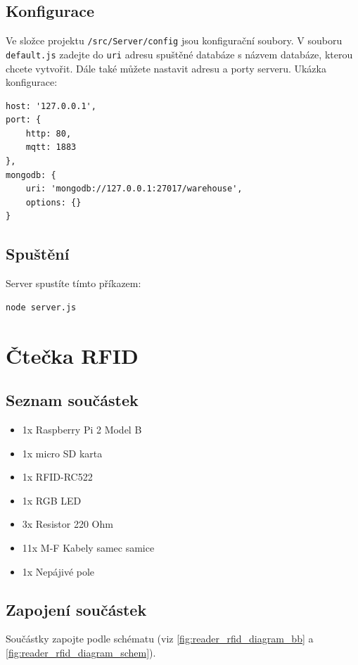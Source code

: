 \documentclass[czech,BP]{thesiskiv}
\begin{document}
\subsection{Konfigurace}
Ve složce projektu \texttt{/src/Server/config} jsou konfigurační soubory. 
V souboru \texttt{default.js} zadejte do \texttt{uri} adresu spuštěné databáze s názvem databáze, kterou chcete vytvořit.
Dále také můžete nastavit adresu a porty serveru. Ukázka konfigurace:
 
\begin{verbatim}
host: '127.0.0.1',
port: {
    http: 80,
    mqtt: 1883
},
mongodb: {
    uri: 'mongodb://127.0.0.1:27017/warehouse',
    options: {}
}
\end{verbatim}

\subsection{Spuštění}

Server spustíte tímto příkazem:
\begin{verbatim}
node server.js
\end{verbatim}


\section{Čtečka RFID}
	
\subsection{Seznam součástek}
\begin{itemize}
\item 1x Raspberry Pi 2 Model B
\item 1x micro SD karta 
\item 1x RFID-RC522 
\item 1x RGB LED  
\item 3x Resistor 220 Ohm 
\item 11x M-F Kabely samec samice
\item 1x Nepájivé pole
\end{itemize}

\subsection{Zapojení součástek}

Součástky zapojte podle schématu (viz \ref{fig:reader_rfid_diagram_bb} a \ref{fig:reader_rfid_diagram_schem}).
\end{document}
